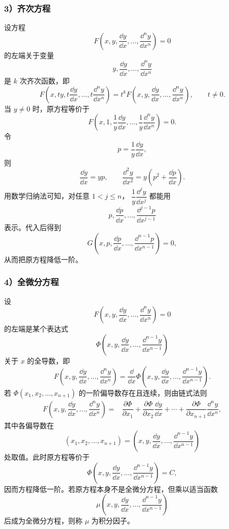 \subsubsection*{3）齐次方程}

设方程
\[
	F\left(
		x,y,\dfrac{\dd y}{\dd x},\ldots,
		\dfrac{\dd^n y}{\dd x^n}
	\right)=0
\]
的左端关于变量
\[
	y, \dfrac{\dd y}{\dd x},\ldots,
	\dfrac{\dd^n y}{\dd x^n}
\]
是 $k$ 次齐次函数，即
\[
	F\left(
		x,ty,t\dfrac{\dd y}{\dd x},\ldots,
		t\dfrac{\dd^n y}{\dd x^n}
	\right)
	=t^kF\left(
		x,y,\dfrac{\dd y}{\dd x},\ldots,
		\dfrac{\dd^n y}{\dd x^n}
	\right),
	\qquad t\neq 0.
\]
当 $y\neq 0$ 时，原方程等价于
\[
	F\left(
		x,1,\dfrac{1}{y}\dfrac{\dd y}{\dd x},\ldots,
		\dfrac{1}{y}\dfrac{\dd^n y}{\dd x^n}
	\right)=0.
\]
令
\[
	p=\dfrac{1}{y}\dfrac{\dd y}{\dd x},
\]
则
\[
	\dfrac{\dd y}{\dd x}=yp,
	\qquad
	\dfrac{\dd^2 y}{\dd x^2}
	=y\left(p^2+\dfrac{\dd p}{\dd x}\right).
\]
用数学归纳法可知，对任意 $1<j\leqslant n$，
$\dfrac{1}{y}\dfrac{\dd^j y}{\dd x^j}$ 都能用
\[
	p, \dfrac{\dd p}{\dd x},\ldots,
	\dfrac{\dd^{j-1}p}{\dd x^{j-1}}
\]
表示。代入后得到
\[
	G\left(
		x,p,\dfrac{\dd p}{\dd x},\ldots,
		\dfrac{\dd^{n-1}p}{\dd x^{n-1}}
	\right)=0,
\]
从而把原方程降低一阶。

\subsubsection*{4）全微分方程}

设
\[
	F\left(
		x,y,\dfrac{\dd y}{\dd x},\ldots,
		\dfrac{\dd^n y}{\dd x^n}
	\right)=0
\]
的左端是某个表达式
\[
	\Phi\left(
		x,y,\dfrac{\dd y}{\dd x},\ldots,
		\dfrac{\dd^{n-1}y}{\dd x^{n-1}}
	\right)
\]
关于 $x$ 的全导数，即
\[
	F\left(
		x,y,\dfrac{\dd y}{\dd x},\ldots,
		\dfrac{\dd^n y}{\dd x^n}
	\right)
	=
	\dfrac{\dd}{\dd x}
	\Phi\left(
		x,y,\dfrac{\dd y}{\dd x},\ldots,
		\dfrac{\dd^{n-1}y}{\dd x^{n-1}}
	\right).
\]
若 $\Phi(x_1,x_2,\ldots,x_{n+1})$ 的一阶偏导数存在且连续，则由链式法则
\[
	\begin{aligned}
	F\left(
		x,y,\dfrac{\dd y}{\dd x},\ldots,
		\dfrac{\dd^n y}{\dd x^n}
	\right)
	={}&\dfrac{\partial\Phi}{\partial x_1}
	+\dfrac{\partial\Phi}{\partial x_2}\dfrac{\dd y}{\dd x}
	+\cdots
	+\dfrac{\partial\Phi}{\partial x_{n+1}}
	\dfrac{\dd^n y}{\dd x^n},
	\end{aligned}
\]
其中各偏导数在
\[
	(x_1,x_2,\ldots,x_{n+1})
	=\left(
		x,y,\dfrac{\dd y}{\dd x},\ldots,
		\dfrac{\dd^{n-1}y}{\dd x^{n-1}}
	\right)
\]
处取值。此时原方程等价于
\[
	\Phi\left(
		x,y,\dfrac{\dd y}{\dd x},\ldots,
		\dfrac{\dd^{n-1}y}{\dd x^{n-1}}
	\right)=C,
\]
因而方程降低一阶。若原方程本身不是全微分方程，但乘以适当函数
\[
	\mu\left(
		x,y,\dfrac{\dd y}{\dd x},\ldots,
		\dfrac{\dd^{n-1}y}{\dd x^{n-1}}
	\right)
\]
后成为全微分方程，则称 $\mu$ 为积分因子。

